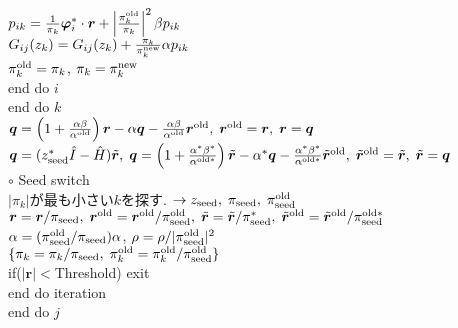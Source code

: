 \documentclass[12pt,titlepage]{jarticle}
\begin{document}
$p_{i k} = \frac{1}{\pi_k} {\boldsymbol \varphi}_i^* \cdot {\boldsymbol r} + 
\left|\frac{\pi^{\rm old}_k}{\pi_k } \right|^2 \beta p_{i k}$
\\\hspace{2.0cm}
$G_{i j}(z_k) = G_{i j}(z_k) + \frac{\pi_k}{\pi_k^{\rm new}} \alpha p_{i k}$
\\\hspace{2.0cm}
$\pi_k^{\rm old} = \pi_k$, $\pi_k = \pi_k^{\rm new}$
\\\hspace{1.5cm}
end do $i$
\\\hspace{1.0cm}
end do $k$
\\\hspace{1.0cm}
${\boldsymbol q} = \left( 1 + \frac{\alpha \beta}{\alpha^{\rm old}} \right) {\boldsymbol r}
- \alpha {\boldsymbol q} - \frac{\alpha \beta}{\alpha^{\rm old}} {\boldsymbol r}^{\rm old},\; 
{\boldsymbol r}^{\rm old} = {\boldsymbol r},\; {\boldsymbol r} = {\boldsymbol q}$
\\\hspace{1.0cm}
${\boldsymbol q} = (z_{\rm seed}^* {\hat I} - {\hat H}) {\tilde {\boldsymbol r}},\;
{\boldsymbol q} = \left( 1 + \frac{\alpha^* \beta^*}{\alpha^{{\rm old} *}} \right) {\tilde {\boldsymbol r}}
- \alpha^* {\boldsymbol q} - \frac{\alpha^* \beta^*}{\alpha^{{\rm old} *}} {\tilde {\boldsymbol r}}^{\rm old},\; 
{\tilde {\boldsymbol r}}^{\rm old} = {\tilde {\boldsymbol r}},\; {\tilde {\boldsymbol r}} = {\boldsymbol q}$
\\\hspace{1.0cm}
$\circ$ Seed switch
\\\hspace{1.0cm}
$|\pi_k|$が最も小さい$k$を探す. 
$\rightarrow z_{\rm seed},\; \pi_{\rm seed},\; \pi_{\rm seed}^{\rm old} $
\\\hspace{1.0cm}
${\boldsymbol r} = {\boldsymbol r} / \pi_{\rm seed},\; 
{\boldsymbol r}^{\rm old} = {\boldsymbol r}^{\rm old} / \pi_{\rm seed}^{\rm old},\; 
{\tilde {\boldsymbol r}} = {\tilde {\boldsymbol r}} / \pi_{\rm seed}^{ *},\; 
{\tilde {\boldsymbol r}}^{\rm old} = {\tilde {\boldsymbol r}}^{\rm old} / \pi_{\rm seed}^{{\rm old}*}$
\\\hspace{1.0cm}
$\alpha = (\pi_{\rm seed}^{\rm old} / \pi_{\rm seed}) \alpha$,
$\rho = \rho / |\pi_{\rm seed}^{\rm old}|^2$
\\\hspace{1.0cm}
$\{\pi_k = \pi_k / \pi_{\rm seed},\; \pi_k^{\rm old} = \pi_k^{\rm old} / \pi_{\rm seed}^{\rm old}\}$
\\\hspace{1.0cm}
if($|{\boldsymbol r}| < $Threshold) exit
\\\hspace{0.5cm}
end do iteration
\\
end do $j$
\end{document}
